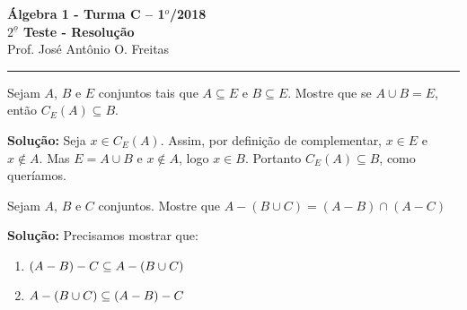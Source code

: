 \documentclass[12pt]{article}
\begin{document}


\begin{center}
{\Large\bf {\'A}lgebra 1 - Turma C -- 1$^{o}$/2018} \\ \vspace{9pt} {\large\bf
  $2^{\underline{o}}$ Teste - Resolu\c{c}\~ao}\\
\vspace{9pt} Prof. Jos{\'e} Ant{\^o}nio O. Freitas
\end{center}
\hrule

\vspace{.6cm}

\questao Sejam $A$, $B$ e $E$ conjuntos tais que $A \subseteq E$ e $B \subseteq E$. Mostre que se $A \cup B = E$, então $C_E(A) \subseteq B$.

\noindent\textbf{Solu\c{c}\~ao:} Seja $x \in C_E(A)$. Assim, por definição de complementar, $x \in E$ e $x \notin A$. Mas $E = A \cup B$ e $x \notin A$, logo $x \in B$. Portanto $C_E(A) \subseteq B$, como queríamos.

\vspace{.5cm}

\questao Sejam $A$, $B$ e $C$ conjuntos. Mostre que $A - (B \cup C) = (A - B) \cap (A - C)$

\noindent\textbf{Solu\c{c}\~ao:} Precisamos mostrar que:
\begin{enumerate}[label={\roman*})]
	\item $(A - B) - C \subseteq A - (B \cup C)$
	\item $A - (B \cup C) \subseteq (A - B) - C$
\end{enumerate}
\end{document}
